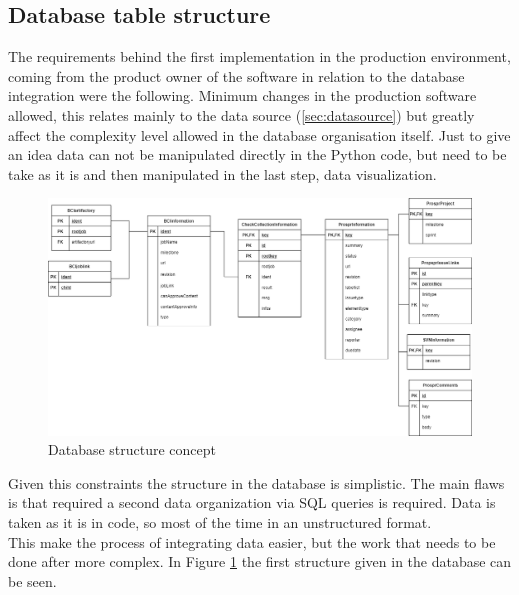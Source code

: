 \documentclass[../main.tex]{subfiles}
\begin{document}
\subsection{Database table structure}
The requirements behind the first implementation in the production environment, coming from the product owner of the software in relation to the database integration were the following. Minimum changes in the production software allowed, this relates mainly to the data source (\ref{sec:datasource}) but greatly affect the complexity level allowed in the database organisation itself. Just to give an idea data can not be manipulated directly in the Python code, but need to be take as it is and then manipulated in the last step, data visualization. 
\begin{figure}[H]
    \centering
    \includegraphics[width=\linewidth]{images_folder/EADBEntity.png}
    \caption{Database structure concept}
    \label{fig:dbsterconce}
\end{figure}
Given this constraints the structure in the database is simplistic. The main flaws is that required a second data organization via SQL queries is required. Data is taken as it is in code, so most of the time in an unstructured format.\\
This make the process of integrating data easier, but the work that needs to be done after more complex. In Figure \ref{fig:dbsterconce} the first structure given in the database can be seen.
\end{document}
